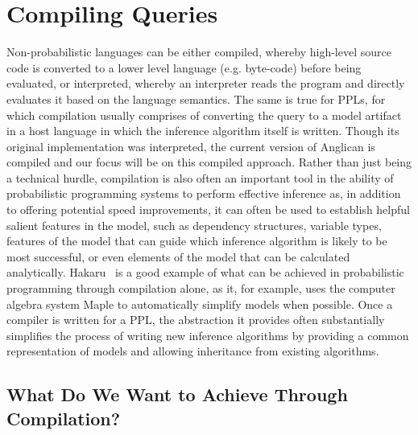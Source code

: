 
\section{Compiling Queries}
\label{sec:proginf:comp}

Non-probabilistic languages can be either compiled, whereby high-level source code
is converted to a lower level language (e.g. byte-code) before being evaluated, or interpreted,
whereby an interpreter reads the program and directly evaluates it based on the language
semantics.
The same is true for PPLs, for which compilation usually comprises of converting the
query to a model artifact in a host language in which the inference algorithm itself is
written.  Though its original implementation was interpreted, the current version of
Anglican is compiled and our focus will be on this compiled approach.
Rather than just being a technical hurdle, compilation is also 
often an important tool in the ability of probabilistic programming systems to perform
effective inference as, in addition to offering potential speed improvements,
it can often be used to establish helpful salient features in the model,
such as dependency structures, variable types, features of the model that can guide
which inference algorithm is likely to be most successful, or even elements of the model
that can be calculated analytically.  Hakaru~\citep{narayanan2016probabilistic,zinkov2016composing} is a good
example of what can be achieved in probabilistic programming through compilation alone,
as it, for example, uses the computer algebra system Maple to automatically simplify models
when possible.  Once a compiler is written for a PPL, the abstraction it provides often substantially simplifies
the process of writing new inference algorithms by providing a common representation of
models and allowing inheritance from existing algorithms.

\subsection{What Do We Want to Achieve Through Compilation?}
\label{sec:proginf:comp:want}

